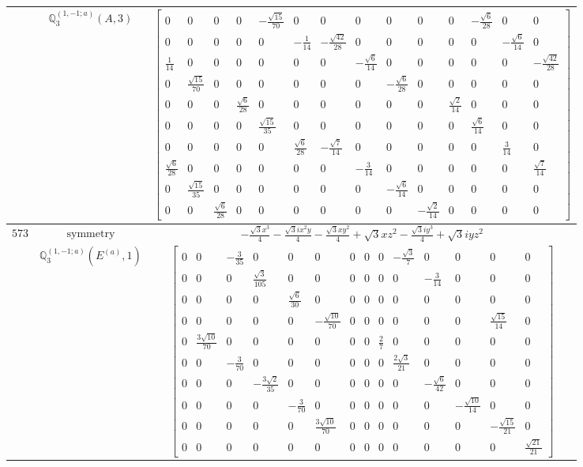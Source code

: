 \documentclass[fleqn,8pt,landscape]{jsarticle}
\begin{document}
\begin{longtable}{ccc}
$  $ & $ \mathbb{Q}_{3}^{(1,-1;a)}(A,3) $ & $ \begin{bmatrix} 0 & 0 & 0 & 0 & - \frac{\sqrt{15}}{70} & 0 & 0 & 0 & 0 & 0 & 0 & - \frac{\sqrt{6}}{28} & 0 & 0 \\ 0 & 0 & 0 & 0 & 0 & - \frac{1}{14} & - \frac{\sqrt{42}}{28} & 0 & 0 & 0 & 0 & 0 & - \frac{\sqrt{6}}{14} & 0 \\ \frac{1}{14} & 0 & 0 & 0 & 0 & 0 & 0 & - \frac{\sqrt{6}}{14} & 0 & 0 & 0 & 0 & 0 & - \frac{\sqrt{42}}{28} \\ 0 & \frac{\sqrt{15}}{70} & 0 & 0 & 0 & 0 & 0 & 0 & - \frac{\sqrt{6}}{28} & 0 & 0 & 0 & 0 & 0 \\ 0 & 0 & 0 & \frac{\sqrt{6}}{28} & 0 & 0 & 0 & 0 & 0 & 0 & \frac{\sqrt{2}}{14} & 0 & 0 & 0 \\ 0 & 0 & 0 & 0 & \frac{\sqrt{15}}{35} & 0 & 0 & 0 & 0 & 0 & 0 & \frac{\sqrt{6}}{14} & 0 & 0 \\ 0 & 0 & 0 & 0 & 0 & \frac{\sqrt{6}}{28} & - \frac{\sqrt{7}}{14} & 0 & 0 & 0 & 0 & 0 & \frac{3}{14} & 0 \\ \frac{\sqrt{6}}{28} & 0 & 0 & 0 & 0 & 0 & 0 & - \frac{3}{14} & 0 & 0 & 0 & 0 & 0 & \frac{\sqrt{7}}{14} \\ 0 & \frac{\sqrt{15}}{35} & 0 & 0 & 0 & 0 & 0 & 0 & - \frac{\sqrt{6}}{14} & 0 & 0 & 0 & 0 & 0 \\ 0 & 0 & \frac{\sqrt{6}}{28} & 0 & 0 & 0 & 0 & 0 & 0 & - \frac{\sqrt{2}}{14} & 0 & 0 & 0 & 0 \end{bmatrix} $ \\ \hline
$ 573 $ & $ \text{symmetry} $ & $ - \frac{\sqrt{3} x^{3}}{4} - \frac{\sqrt{3} i x^{2} y}{4} - \frac{\sqrt{3} x y^{2}}{4} + \sqrt{3} x z^{2} - \frac{\sqrt{3} i y^{3}}{4} + \sqrt{3} i y z^{2} $ \\
$  $ & $ \mathbb{Q}_{3}^{(1,-1;a)}(E^{(a)},1) $ & $ \begin{bmatrix} 0 & 0 & - \frac{3}{35} & 0 & 0 & 0 & 0 & 0 & 0 & - \frac{\sqrt{3}}{7} & 0 & 0 & 0 & 0 \\ 0 & 0 & 0 & \frac{\sqrt{3}}{105} & 0 & 0 & 0 & 0 & 0 & 0 & - \frac{3}{14} & 0 & 0 & 0 \\ 0 & 0 & 0 & 0 & \frac{\sqrt{6}}{30} & 0 & 0 & 0 & 0 & 0 & 0 & 0 & 0 & 0 \\ 0 & 0 & 0 & 0 & 0 & - \frac{\sqrt{10}}{70} & 0 & 0 & 0 & 0 & 0 & 0 & \frac{\sqrt{15}}{14} & 0 \\ 0 & \frac{3 \sqrt{10}}{70} & 0 & 0 & 0 & 0 & 0 & 0 & \frac{2}{7} & 0 & 0 & 0 & 0 & 0 \\ 0 & 0 & - \frac{3}{70} & 0 & 0 & 0 & 0 & 0 & 0 & \frac{2 \sqrt{3}}{21} & 0 & 0 & 0 & 0 \\ 0 & 0 & 0 & - \frac{3 \sqrt{2}}{35} & 0 & 0 & 0 & 0 & 0 & 0 & - \frac{\sqrt{6}}{42} & 0 & 0 & 0 \\ 0 & 0 & 0 & 0 & - \frac{3}{70} & 0 & 0 & 0 & 0 & 0 & 0 & - \frac{\sqrt{10}}{14} & 0 & 0 \\ 0 & 0 & 0 & 0 & 0 & \frac{3 \sqrt{10}}{70} & 0 & 0 & 0 & 0 & 0 & 0 & - \frac{\sqrt{15}}{21} & 0 \\ 0 & 0 & 0 & 0 & 0 & 0 & 0 & 0 & 0 & 0 & 0 & 0 & 0 & \frac{\sqrt{21}}{21} \end{bmatrix} $ \\ \hline

\end{longtable}
\end{document}
